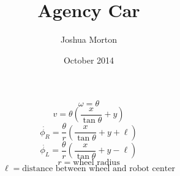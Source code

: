 \documentclass{article}
\title{Agency Car}
\author{Joshua Morton }
\date{October 2014}
\begin{document}
\maketitle
\[\omega = \theta\]
\[v = \theta (\frac{x}{\tan\theta}+y)\]
\[\dot{\phi_R} = \frac{\theta}{r}(\frac{x}{\tan\theta} + y + \ell)\]
\[\dot{\phi_L} = \frac{\theta}{r}(\frac{x}{\tan\theta} + y - \ell)\]
\[r = \mbox{wheel radius}\]
\[\ell = \mbox{distance between wheel and robot center}\]
\end{document}
